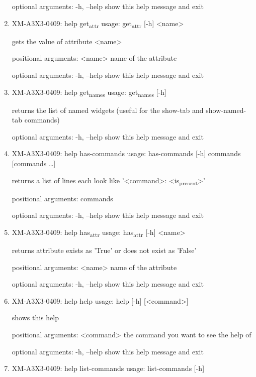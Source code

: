\documentclass[11pt]{article}
\begin{document}
\begin{enumerate}
optional arguments:
  -h, --help  show this help message and exit

\item XM-A3X3-0409: help get\textsubscript{attr}
\label{sec:org6f730ad}
usage: get\textsubscript{attr} [-h] <name>

gets the value of attribute <name>

positional arguments:
  <name>      name of the attribute

optional arguments:
  -h, --help  show this help message and exit

\item XM-A3X3-0409: help get\textsubscript{names}
\label{sec:org0a8d2b0}
usage: get\textsubscript{names} [-h]

returns the list of named widgets (useful for the show-tab and show-named-tab
commands)

optional arguments:
  -h, --help  show this help message and exit

\item XM-A3X3-0409: help has-commands
\label{sec:orga8cc9a2}
usage: has-commands [-h] commands [commands \ldots{}]

returns a list of lines each look like '<command>: <is\textsubscript{present}>'

positional arguments:
  commands

optional arguments:
  -h, --help  show this help message and exit

\item XM-A3X3-0409: help has\textsubscript{attr}
\label{sec:orgc4d4ebc}
usage: has\textsubscript{attr} [-h] <name>

returns attribute exists as 'True' or does not exist as 'False'

positional arguments:
  <name>      name of the attribute

optional arguments:
  -h, --help  show this help message and exit

\item XM-A3X3-0409: help help
\label{sec:org9d7be35}
usage: help [-h] [<command>]

shows this help

positional arguments:
  <command>   the command you want to see the help of

optional arguments:
  -h, --help  show this help message and exit

\item XM-A3X3-0409: help list-commands
\label{sec:org7095353}
usage: list-commands [-h]


\end{enumerate}
\end{document}
